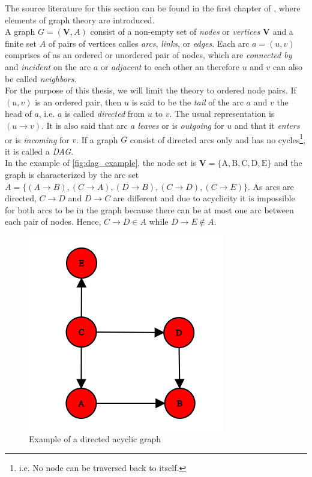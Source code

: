 
The source literature for this section can be found in the first chapter of \cite{nagarajan2013bayesian}, where elements of graph theory are introduced.
\\

A graph $G=(\mathbf{V}, A)$ consist of a non-empty set of \textit{nodes} or \textit{vertices} $\bm{V}$ and a finite set $A$ of pairs of vertices calles \textit{arcs}, \textit{links}, or \textit{edges}. Each arc $a=(u, v)$ comprises of as an ordered or unordered pair of nodes, which are \textit{connected by} and \textit{incident} on the arc $a$ or \textit{adjacent} to each other an therefore $u$ and $v$ can also be called \textit{neighbors}. \\

For the purpose of this thesis, we will limit the theory to ordered node pairs. If $(u,v)$ is an ordered pair, then $u$ is said to be the \textit{tail} of the arc $a$ and $v$ the head of $a$, i.e. $a$ is called \textit{directed} from $u$ to $v$. The usual representation is $(u \rightarrow v)$. It is also said that arc $a$ \textit{leaves} or is \textit{outgoing} for $u$ and that it \textit{enters} or is \textit{incoming} for $v$. If a graph $G$ consist of directed arcs only and has no cycles\footnote{i.e. No node can be traversed back to itself.}, it is called a \textit{\ac{DAG}}. \\ In the example of \autoref{fig:dag_example}, the node set is $\mathbf{V}=\{\mathrm{A}, \mathrm{B}, \mathrm{C}, \mathrm{D}, \mathrm{E}\}$ and the graph is characterized by the arc set $A=\{(A \rightarrow B),(C \rightarrow A),(D \rightarrow B),(C \rightarrow D),(C \rightarrow E)\}$. As arcs are directed, $C \rightarrow D$ and $D \rightarrow C$ are different and due to acyclicity it is impossible for both arcs to be in the graph because there can be at most one arc between each pair of nodes. Hence, $C \rightarrow D \in A$ while $D \rightarrow E \notin A$.
\\


\begin{figure}[H]
\centering
  \includegraphics[width=0.45\linewidth]{figures/dag_example.png}
  \caption{Example of a directed acyclic graph}
  \label{fig:dag_example}
\end{figure}

